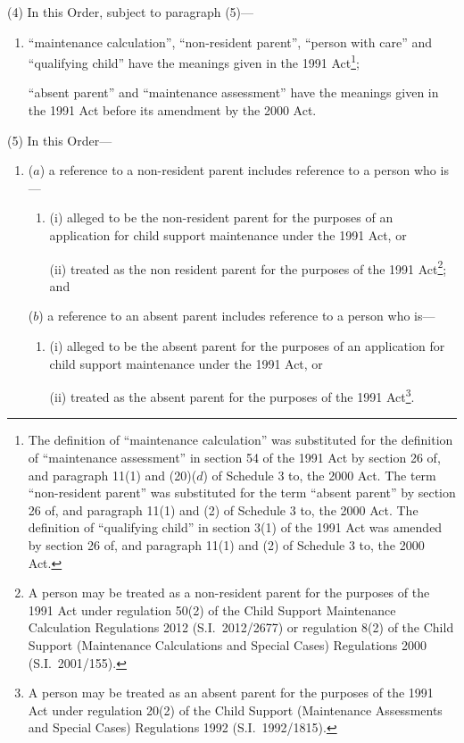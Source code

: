 \documentclass[12pt,a4paper]{article}
\begin{document}
(4) In this Order, subject to paragraph (5)—
\begin{enumerate}\item[]
“maintenance calculation”, “non-resident parent”, “person with care” and “qualifying child” have the meanings given in the 1991 Act\footnote{The definition of “maintenance calculation” was substituted for the definition of “maintenance assessment” in section 54 of the 1991 Act by section 26 of, and paragraph 11(1) and (20)($d$)  of Schedule 3 to, the 2000 Act. The term “non-resident parent” was substituted for the term “absent parent” by section 26 of, and paragraph 11(1) and (2) of Schedule 3 to, the 2000 Act. The definition of “qualifying child” in section 3(1) of the 1991 Act was amended by section 26 of, and paragraph 11(1) and (2) of Schedule 3 to, the 2000 Act.};

“absent parent” and “maintenance assessment” have the meanings given in the 1991 Act before its amendment by the 2000 Act.
\end{enumerate}

(5) In this Order—
\begin{enumerate}\item[]
($a$) a reference to a non-resident parent includes reference to a person who is—
\begin{enumerate}\item[]
(i) alleged to be the non-resident parent for the purposes of an application for child support maintenance under the 1991 Act, or

(ii) treated as the non resident parent for the purposes of the 1991 Act\footnote{A person may be treated as a non-resident parent for the purposes of the 1991 Act under regulation 50(2) of the Child Support Maintenance Calculation Regulations 2012 (S.I.~2012/2677) or regulation 8(2) of the Child Support (Maintenance Calculations and Special Cases) Regulations 2000 (S.I.~2001/155).}; and
\end{enumerate}

($b$) a reference to an absent parent includes reference to a person who is—
\begin{enumerate}\item[]
(i) alleged to be the absent parent for the purposes of an application for child support maintenance under the 1991 Act, or

(ii) treated as the absent parent for the purposes of the 1991 Act\footnote{A person may be treated as an absent parent for the purposes of the 1991 Act under regulation 20(2) of the Child Support (Maintenance Assessments and Special Cases) Regulations 1992 (S.I.~1992/1815).}.
\end{enumerate}
\end{enumerate}
\end{document}
